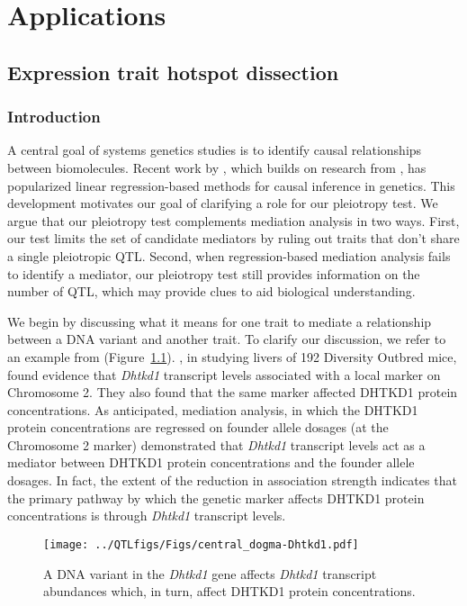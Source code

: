 \documentclass[oneside]{book}
\begin{document}


\chapter{Applications}
\section{Expression trait hotspot dissection}
\subsection{Introduction}

A central goal of systems genetics studies is to identify causal relationships between biomolecules. Recent work by \citet{chick2016defining}, which builds on research from \citet{baron1986moderator}, has popularized linear regression-based methods for causal inference in genetics. This development motivates our goal of clarifying a role for our pleiotropy test. We argue that our pleiotropy test complements mediation analysis in two ways. First, our test limits the set of candidate mediators by ruling out traits that don't share a single pleiotropic QTL. Second, when regression-based mediation analysis fails to identify a mediator, our pleiotropy test still provides information on the number of QTL, which may provide clues to aid biological understanding.


We begin by discussing what it means for one trait to mediate a relationship between a DNA variant and another trait. To clarify our discussion, we refer to an example from \citet{chick2016defining} (Figure~\ref{fig:Dhtkd1}). \citet{chick2016defining}, in studying livers of 192 Diversity Outbred mice, found evidence that \emph{Dhtkd1} transcript levels associated with a local marker on Chromosome 2. They also found that the same marker affected DHTKD1 protein concentrations. 
As anticipated, mediation analysis, in which the DHTKD1 protein concentrations are regressed on founder allele dosages (at the Chromosome 2 marker) demonstrated that \emph{Dhtkd1} transcript levels act as a mediator between DHTKD1 protein concentrations and the founder allele dosages. In fact, the extent of the reduction in association strength indicates that the primary pathway by which the genetic marker affects DHTKD1 protein concentrations is through \emph{Dhtkd1} transcript levels.

\begin{figure}
  \centering
  \texttt{[image: ../QTLfigs/Figs/central\_dogma-Dhtkd1.pdf]}
  \caption{A DNA variant in the \emph{Dhtkd1} gene affects \emph{Dhtkd1} transcript abundances which, in turn, affect DHTKD1 protein concentrations.}\label{fig:Dhtkd1}
\end{figure}
\end{document}
